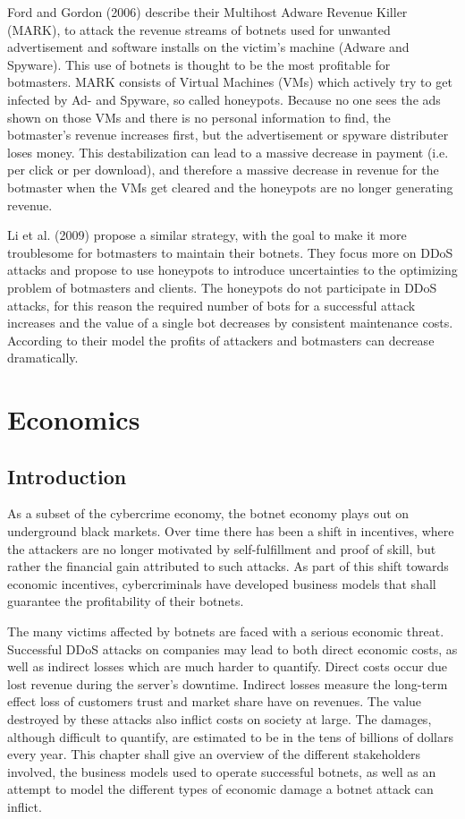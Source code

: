 Ford and Gordon (2006) describe their Multihost Adware Revenue Killer (MARK), to attack the revenue streams of botnets used for unwanted advertisement and software installs on the victim's machine (Adware and Spyware). This use of botnets is thought to be the most profitable for botmasters. MARK consists of Virtual Machines (VMs) which actively try to get infected by Ad- and Spyware, so called honeypots. Because no one sees the ads shown on those VMs and there is no personal information to find, the botmaster's revenue increases first, but the advertisement or spyware distributer loses money. This destabilization can lead to a massive decrease in payment (i.e. per click or per download), and therefore a massive decrease in revenue for the botmaster when the VMs get cleared and the honeypots are no longer generating revenue. \cite{Ford07}

Li et al. (2009) propose a similar strategy, with the goal to make it more troublesome for botmasters to maintain their botnets. They focus more on DDoS attacks and propose to use honeypots to introduce uncertainties to the optimizing problem of botmasters and clients. The honeypots do not participate in DDoS attacks, for this reason the required number of bots for a successful attack increases and the value of a single bot decreases by consistent maintenance costs. According to their model the profits of attackers and botmasters can decrease dramatically.  \cite{Li09}

\section{Economics}
	\subsection{Introduction}
	As a subset of the cybercrime economy, the botnet economy plays out on underground black markets. Over time there has been a shift in incentives, where the attackers are no longer motivated by self-fulfillment and proof of skill, but rather the financial gain attributed to such attacks. As part of this shift towards economic incentives, cybercriminals have developed business models that shall guarantee the profitability of their botnets. \cite{Li09}

The many victims affected by botnets are faced with a serious economic threat. Successful DDoS attacks on companies may lead to both direct economic costs, as well as indirect losses which are much harder to quantify. Direct costs occur due lost revenue during the server's downtime. Indirect losses measure the long-term effect loss of customers trust and market share have on revenues. The value destroyed by these attacks also inflict costs on society at large. The damages, although difficult to quantify, are estimated to be in the tens of billions of dollars every year. \cite{Asghari15}
This chapter shall give an overview of the different stakeholders involved, the business models used to operate successful botnets, as well as an attempt to model the different types of economic damage a botnet attack can inflict. 

